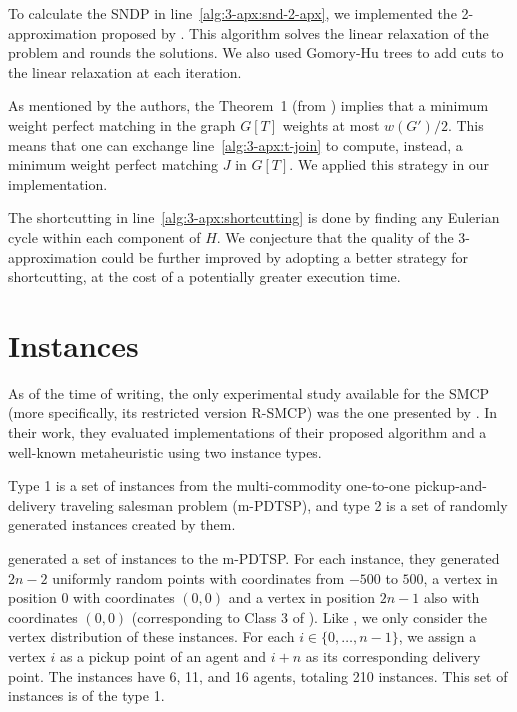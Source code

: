 
To calculate the SNDP in line~\eqref{alg:3-apx:snd-2-apx}, we implemented the 2-approximation proposed by \cite{snd-2-apx}. This algorithm solves the linear relaxation of the problem and rounds the solutions. We also used Gomory-Hu trees to add cuts to the linear relaxation at each iteration.

As mentioned by the authors, the Theorem~1 (from \cite{smcp_3apx}) implies that a minimum weight perfect matching in the graph \(G[T]\) weights at most \(w(G')/2\). This means that one can exchange line~\eqref{alg:3-apx:t-join} to compute, instead, a minimum weight perfect matching \(J\) in \(G[T]\). We applied this strategy in our implementation.

The shortcutting in line~\eqref{alg:3-apx:shortcutting} is done by finding any Eulerian cycle within each component of \(H\). We conjecture that the quality of the 3-approximation could be further improved by adopting a better strategy for shortcutting, at the cost of a potentially greater execution time.

\section{Instances}

As of the time of writing, the only experimental study available for the SMCP (more specifically, its restricted version R-SMCP) was the one presented by \cite{Pereira2018TheSM}. In their work, they evaluated implementations of their proposed algorithm and a well-known metaheuristic using two instance types.

Type 1 is a set of instances from the multi-commodity one-to-one pickup-and-delivery traveling salesman problem (m-PDTSP), and type 2 is a set of randomly generated instances created by them.

\cite{HERNANDEZPEREZ2009987} generated a set of instances to the m-PDTSP. For each instance, they generated \(2n - 2\) uniformly random points with coordinates from \(-500\) to \(500\), a vertex in position \(0\) with coordinates \((0, 0)\) and a vertex in position \(2n - 1\) also with coordinates \((0, 0)\) (corresponding to Class 3 of \cite{HERNANDEZPEREZ2009987}). Like \cite{Pereira2018TheSM}, we only consider the vertex distribution of these instances. For each \(i \in \{0, \dots, n - 1\}\), we assign a vertex \(i\) as a pickup point of an agent and \(i + n\) as its corresponding delivery point. The instances have 6, 11, and 16 agents, totaling 210 instances. This set of instances is of the type 1.

